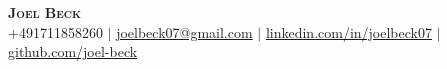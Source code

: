 
\begin{center}
    \textbf{\Huge \scshape Joel Beck} \\
    \vspace{4pt}
    \small +491711858260 $|$
    \href{mailto:joelbeck07@gmail.com}{joelbeck07@gmail.com} $|$
    \href{https://www.linkedin.com/in/joelbeck07}{linkedin.com/in/joelbeck07} $|$
    \href{https://github.com/joel-beck}{github.com/joel-beck}
\end{center}
